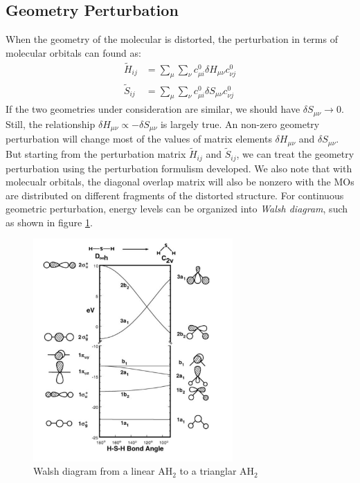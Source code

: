 \documentclass{article}
\begin{document}
\subsection{Geometry Perturbation}
When the geometry of the molecular is distorted, the perturbation in terms of molecular orbitals can found as:
\begin{align}
    \tilde{H}_{ij} &= \sum_{\mu}\sum_{\nu} c_{\mu i}^0 \delta H_{\mu \nu} c_{\nu j}^0 \\ 
    \tilde{S}_{ij} &= \sum_{\mu}\sum_{\nu} c_{\mu i}^0 \delta S_{\mu \nu} c_{\nu j}^0 
\end{align} 
If the two geometries under consideration are similar, we should have $\delta S_{\mu \nu} \to 0$. Still, the relationship
$\delta H_{\mu \nu} \propto - \delta S_{\mu \nu}$ is largely true. An non-zero geometry perturbation will change most 
of the values of matrix elements $\delta H_{\mu \nu}$ and $\delta S_{\mu \nu}$. But starting from the perturbation 
matrix $\tilde{H}_{ij}$ and $\tilde{S}_{ij}$, we can treat the geometry perturbation using the perturbation formulism 
developed. We also note that with molecualr orbitals, the diagonal overlap matrix will also be nonzero with the 
MOs are distributed on different fragments of the distorted structure. For continuous geometric perturbation, energy 
levels can be organized into \emph{Walsh diagram}, such as shown in figure \ref{F:walsh_diagram}.
\begin{figure}[h!]
    \centering
    \includegraphics[width=3in]{figures/F_walsh_diagram.png}
    \caption{Walsh diagram from a linear AH$_2$ to a trianglar AH$_2$}
    \label{F:walsh_diagram}
\end{figure}
\end{document}
